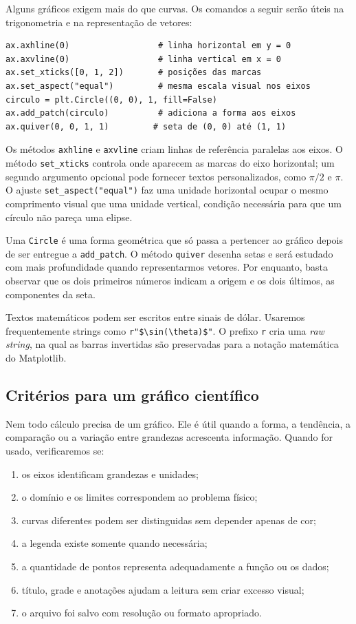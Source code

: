 Alguns gráficos exigem mais do que curvas. Os comandos a seguir serão úteis na trigonometria e na representação de vetores:

\begin{lstlisting}
ax.axhline(0)                  # linha horizontal em y = 0
ax.axvline(0)                  # linha vertical em x = 0
ax.set_xticks([0, 1, 2])       # posições das marcas
ax.set_aspect("equal")         # mesma escala visual nos eixos
circulo = plt.Circle((0, 0), 1, fill=False)
ax.add_patch(circulo)          # adiciona a forma aos eixos
ax.quiver(0, 0, 1, 1)         # seta de (0, 0) até (1, 1)
\end{lstlisting}

Os métodos \texttt{axhline} e \texttt{axvline} criam linhas de referência paralelas aos eixos. O método \texttt{set\_xticks} controla onde aparecem as marcas do eixo horizontal; um segundo argumento opcional pode fornecer textos personalizados, como $\pi/2$ e $\pi$. O ajuste \texttt{set\_aspect("equal")} faz uma unidade horizontal ocupar o mesmo comprimento visual que uma unidade vertical, condição necessária para que um círculo não pareça uma elipse.

Uma \texttt{Circle} é uma forma geométrica que só passa a pertencer ao gráfico depois de ser entregue a \texttt{add\_patch}. O método \texttt{quiver} desenha setas e será estudado com mais profundidade quando representarmos vetores. Por enquanto, basta observar que os dois primeiros números indicam a origem e os dois últimos, as componentes da seta.

Textos matemáticos podem ser escritos entre sinais de dólar. Usaremos frequentemente strings como \lstinline|r"$\sin(\theta)$"|. O prefixo \texttt{r} cria uma \emph{raw string}, na qual as barras invertidas são preservadas para a notação matemática do Matplotlib.

\subsection{Critérios para um gráfico científico}

Nem todo cálculo precisa de um gráfico. Ele é útil quando a forma, a tendência, a comparação ou a variação entre grandezas acrescenta informação. Quando for usado, verificaremos se:

\begin{enumerate}
  \item os eixos identificam grandezas e unidades;
  \item o domínio e os limites correspondem ao problema físico;
  \item curvas diferentes podem ser distinguidas sem depender apenas de cor;
  \item a legenda existe somente quando necessária;
  \item a quantidade de pontos representa adequadamente a função ou os dados;
  \item título, grade e anotações ajudam a leitura sem criar excesso visual;
  \item o arquivo foi salvo com resolução ou formato apropriado.
\end{enumerate}

